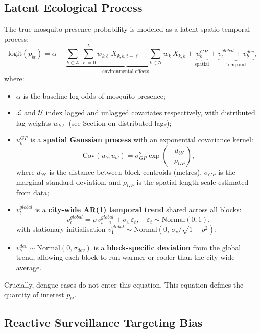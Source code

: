 \documentclass[12pt,a4paper]{article}
\begin{document}
\subsection{Latent Ecological Process}

The true mosquito presence probability is modeled as a latent spatio-temporal process:
\begin{equation}
\text{logit}(p_{bt}) = \alpha + \underbrace{\sum_{k \in \mathcal{L}} \sum_{\ell=0}^{L} w_{k\ell}\, X_{k,b,t-\ell} + \sum_{k \in \mathcal{U}} w_k\, X_{k,b}}_{\text{environmental effects}} + \underbrace{u_b^{GP}}_{\text{spatial}} + \underbrace{v_t^{global} + v_b^{dev}}_{\text{temporal}},
\end{equation}
where:
\begin{itemize}
  \item $\alpha$ is the baseline log-odds of mosquito presence;
  \item $\mathcal{L}$ and $\mathcal{U}$ index lagged and unlagged covariates respectively, with distributed lag weights $w_{k\ell}$ (see Section on distributed lags);
  \item $u_b^{GP}$ is a \textbf{spatial Gaussian process} with an exponential covariance kernel:
  \[
    \text{Cov}(u_b, u_{b'}) = \sigma_{GP}^2 \exp\!\left(-\frac{d_{bb'}}{\rho_{GP}}\right),
  \]
  where $d_{bb'}$ is the distance between block centroids (metres), $\sigma_{GP}$ is the marginal standard deviation, and $\rho_{GP}$ is the spatial length-scale estimated from data;
  \item $v_t^{global}$ is a \textbf{city-wide AR(1) temporal trend} shared across all blocks:
  \[
    v_t^{global} = \rho\, v_{t-1}^{global} + \sigma_v\, \varepsilon_t, \quad \varepsilon_t \sim \text{Normal}(0,1),
  \]
  with stationary initialisation $v_1^{global} \sim \text{Normal}(0,\, \sigma_v / \sqrt{1-\rho^2})$;
  \item $v_b^{dev} \sim \text{Normal}(0, \sigma_{dev})$ is a \textbf{block-specific deviation} from the global trend, allowing each block to run warmer or cooler than the city-wide average.
\end{itemize}
Crucially, dengue cases do not enter this equation. This equation defines the quantity of interest $p_{bt}$.

\subsection{Reactive Surveillance Targeting Bias}
\end{document}
